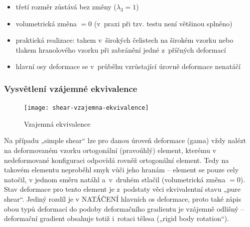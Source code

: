 \begin{itemize}
	\item třetí rozměr zůstává bez změny ($\lambda_3 = 1$)
	\item volumetrická změna $= 0$ (v~praxi při tzv.  testu není většinou splněno)
	\item praktická realizace: tahem v~širokých čelistech na širokém vzorku nebo tlakem hranolového vzorku při zabránění jedné z~příčných deformací
\item hlavní osy deformace se v~průběhu vzrůstající úrovně deformace nenatáčí
\end{itemize}

\subsubsection{Vysvětlení vzájemné ekvivalence}
\begin{figure}[H]
	\centering
	\texttt{[image: shear-vzajemna-ekvivalence]}
	\caption{Vzajemná ekvivalence}
	\label{fig:shear-vzajemna-ekvivalence}
\end{figure}

Na případu „simple shear“ lze pro danou úroveň deformace (gama) vždy nalézt na deformovaném vzorku ortogonální (pravoúhlý) element, kterému v nedeformované konfiguraci odpovídá rovněž ortogonální element. Tedy na takovém elementu neproběhl smyk vůči jeho hranám -- element se pouze cely natočil, v jednom směru natáhl a~v~druhém stlačil (volumetrická změna $= 0$). Stav deformace pro tento element je z~podstaty věci ekvivalentní stavu „pure shear“. Jediný rozdíl je v NATÁČENÍ hlavních os deformace,  proto také zápis obou typů deformací do podoby deformačního gradientu je vzájemně odlišný -- deformační gradient obsahuje totiž i~rotaci tělesa („rigid body rotation“).
